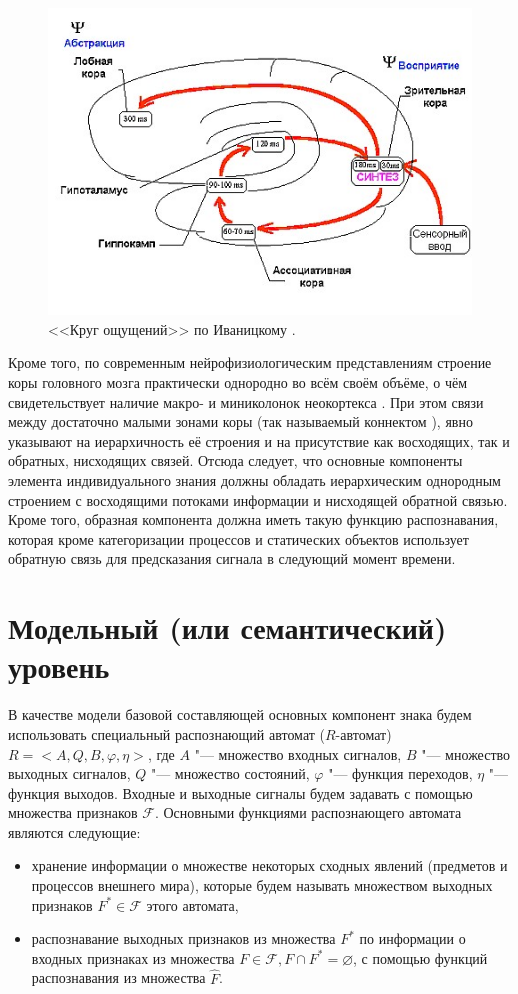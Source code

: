 \documentclass[a4paper, 12pt]{article}
\theoremstyle{plain}
\begin{document}
	\begin{figure}[h]
		\centering
		\includegraphics[width=0.7\linewidth]{ivanitsky_cyrcle}
		\caption{<<Круг ощущений>> по Иваницкому \cite{Ivanitsky1996}.}
		\label{fig:ivan_cyrcle}
	\end{figure}
	
	Кроме того, по современным нейрофизиологическим представлениям строение коры головного мозга практически однородно во всём своём объёме, о чём свидетельствует наличие макро- и миниколонок неокортекса \cite{Mountcastle1998,Rockland2010}. При этом связи между достаточно малыми зонами коры (так называемый коннектом \cite{Zador2012}), явно указывают на иерархичность её строения и на присутствие как восходящих, так и обратных, нисходящих связей. Отсюда следует, что основные компоненты элемента индивидуального знания должны обладать иерархическим однородным строением с восходящими потоками информации и нисходящей обратной связью. Кроме того, образная компонента должна иметь такую функцию распознавания, которая кроме категоризации процессов и статических объектов использует обратную связь для предсказания сигнала в следующий момент времени.
	
	\section{Модельный (или семантический) уровень}
	В качестве модели базовой составляющей основных компонент знака будем использовать специальный распознающий автомат ($R$-автомат) $R=<A,Q,B,\varphi, \eta>$, где $A$ "--- множество входных сигналов, $B$ "--- множество выходных сигналов, $Q$ "--- множество состояний, $\varphi$ "--- функция переходов, $\eta$ "--- функция выходов. Входные и выходные сигналы будем задавать с помощью множества признаков $\mathcal F$. Основными функциями распознающего автомата являются следующие:
	\begin{itemize}
		\item хранение информации о множестве некоторых сходных явлений (предметов и процессов внешнего мира), которые будем называть множеством выходных признаков $F^*\in\mathcal F$ этого автомата,
		\item распознавание выходных признаков из множества $F^*$ по информации о входных признаках из множества $F\in\mathcal F,F\cap F^*=\varnothing$, с помощью функций распознавания из множества $\hat F$.
	\end{itemize}
	
\end{document}
